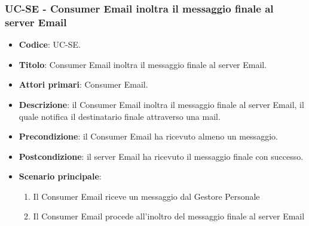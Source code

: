 \subsubsection{UC\theuccount-SE - Consumer Email inoltra il messaggio finale al server Email}
	\begin{itemize}
		\item \textbf{Codice}: UC\theuccount-SE.
		\item \textbf{Titolo}: Consumer Email inoltra il messaggio finale al server Email.
		\item \textbf{Attori primari}: Consumer Email.
		\item \textbf{Descrizione}: il Consumer Email inoltra il messaggio finale al server Email, il quale notifica il destinatario finale attraverso una mail.
		\item \textbf{Precondizione}: il Consumer Email ha ricevuto almeno un messaggio.
		\item \textbf{Postcondizione}: il server Email ha ricevuto il messaggio finale con successo.
		\item \textbf{Scenario principale}: 
		\begin{enumerate}
			\item Il Consumer Email riceve un messaggio dal Gestore Personale
			\item Il Consumer Email procede all'inoltro del messaggio finale al server Email
		\end{enumerate}
		
	\end{itemize}